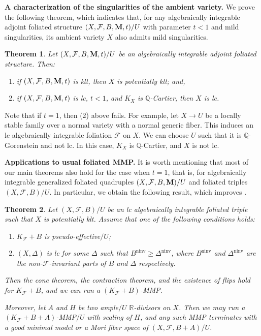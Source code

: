 \documentclass[12pt]{amsart}
\numberwithin{equation}{section}
\newcommand{\Mm}{{\bf{M}}}
\newcommand{\Qq}{\mathbb{Q}}
\newcommand{\Rr}{\mathbb{R}}
\newcommand{\ninv}{\operatorname{ninv}}
\newcommand{\Ff}{\mathcal{F}}
\newtheorem{thm}{Theorem}[section]
\theoremstyle{definition}
\theoremstyle{definition}
\theoremstyle{definition}
\begin{document}
\noindent\textbf{A characterization of the singularities of the ambient variety.} We prove the following theorem, which indicates that, for any algebraically integrable adjoint foliated structure $(X,\Ff,B,\Mm,t)/U$ with parameter $t<1$ and mild singularities, its ambient variety $X$ also admits mild singularities.

\begin{thm}\label{thm: lc afs ambient has nice singularities intro}
    Let $(X,\Ff,B,\Mm,t)/U$ be an algebraically integrable adjoint foliated structure. Then:
    \begin{enumerate}
        \item  if $(X,\Ff,B,\Mm,t)$ is klt, then $X$ is potentially klt; and,
        \item if $(X,\Ff,B,\Mm,t)$ is lc, $t<1$, and $K_X$ is $\Qq$-Cartier, then $X$ is lc.
    \end{enumerate}
\end{thm}

Note that if $t=1$, then (2) above fails. For example, let $X \to U$ be a locally stable family over a normal variety with a normal generic fiber. This induces an lc algebraically integrable foliation $\Ff$ on $X$. We can choose $U$ such that it is $\Qq$-Gorenstein and not lc. In this case, $K_X$ is $\Qq$-Cartier, and $X$ is not lc.


\medskip

\noindent\textbf{Applications to usual foliated MMP.} It is worth mentioning that most of our main theorems also hold for the case when $t=1$, that is, for algebraically integrable generalized foliated quadruples $(X,\Ff,B,\Mm)/U$ and foliated triples $(X,\Ff,B)/U$. In particular, we obtain the following result, which improves \cite[Theorems 1.2 and 1.3]{LMX24b}.

\begin{thm}\label{thm: small improvement LMX24b}
    Let $(X,\Ff,B)/U$ be an lc algebraically integrable foliated triple such that $X$ is potentially klt. Assume that one of the following conditions holds:
    \begin{enumerate}
        \item $K_{\Ff}+B$ is pseudo-effective$/U$;
        \item $(X,\Delta)$ is lc for some $\Delta$ such that $B^{\ninv}\geq\Delta^{\ninv}$, where $B^{\ninv}$ and $\Delta^{\ninv}$ are the non-$\Ff$-invariant parts of $B$ and $\Delta$ respectively.
    \end{enumerate}
    Then the cone theorem, the contraction theorem, and the existence of flips hold for $K_{\Ff}+B$, and we can run a $(K_{\Ff}+B)$-MMP. 
    
    Moreover, let $A$ and $H$ be two ample$/U$ $\Rr$-divisors on $X$. Then we may run a $(K_{\Ff}+B+A)$-MMP$/U$ with scaling of $H$, and any such MMP terminates with a good minimal model or a Mori fiber space of $(X,\Ff,B+A)/U$.
\end{thm}
\end{document}
